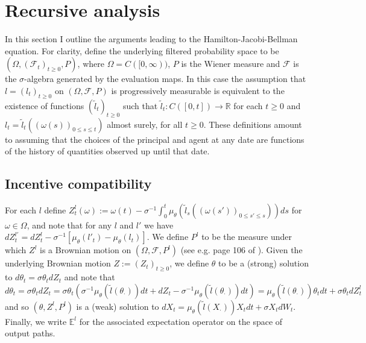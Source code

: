 \documentclass[11pt]{article}
\theoremstyle{plain}
\begin{document}


\appendix

\small

\listoffigures

\section{Recursive analysis}\label{recursiveAPP}

In this section I outline the arguments leading to the Hamilton-Jacobi-Bellman equation. For clarity, define the underlying filtered probability space to be $(\Omega, (\mathcal{F}_t)_{t\geq0},P)$, where $\Omega = C([0,\infty))$, $P$ is the Wiener measure and $\mathcal{F}$ is the $\sigma$-algebra generated by the evaluation maps. In this case the assumption that $l=(l_t)_{t\geq0}$ on $(\Omega, \mathcal{F}, P)$ is progressively measurable is equivalent to the existence of functions $(\tilde{l}_t)_{t\geq0}$ such that $\tilde{l}_t: C([0,t]) \rightarrow \mathbb{R}$ for each $t\geq 0$ and $l_t = \tilde{l}_t((\omega(s))_{0\leq s\leq t})$ almost surely, for all $t \geq0$. These definitions amount to assuming that the choices of the principal and agent at any date are functions of the history of quantities observed up until that date. 

\subsection{Incentive compatibility} \label{ICapp}

For each $l$ define $Z^l_t(\omega) := \omega(t) - \sigma^{-1}\int_{0}^{t}\mu_{\theta}(\tilde{l}_s((\omega(s'))_{0\leq s'\leq s}))ds$ for $\omega \in \Omega$, and note 
that for any $l$ and $l'$ we have $dZ^{l'}_t = dZ^l_t - \sigma^{-1}[\mu_{\theta}(l'_{t}) - \mu_{\theta}(l_{t})]$. We define $P^l$ to be the measure under which $Z^l$ is a Brownian motion on $(\Omega, \mathcal{F}, P^l)$ (see e.g. page 106 of \cite{cvitanic_optimal_2009}). Given the underlying Brownian motion $Z := (Z_t)_{t\geq0}$, we define $\theta$ to be a (strong) solution to $d\theta_t = \sigma \theta_t dZ_t$ and note that
$$
d\theta_t = \sigma \theta_t dZ_t =  \sigma \theta_t {\left(\sigma^{-1}\mu_{\theta}(\tilde{l}(\theta_{\cdot}))dt + dZ_t - \sigma^{-1}\mu_{\theta}(\tilde{l}(\theta_{\cdot}))dt\right)} = \mu_{\theta}(\tilde{l}(\theta_{\cdot}))\theta_t dt + \sigma \theta_t dZ^l_t
$$
and so $(\theta, Z^l, P^l)$ is a (weak) solution to $dX_t = \mu_{\theta}(\tilde{l}(X_{\cdot}))X_t dt + \sigma X_t dW_t$. Finally, we write $\mathbb{E}^l$ for the associated expectation operator on the space of output paths. 
\end{document}
